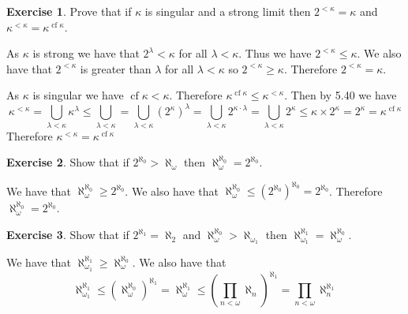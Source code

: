 \documentclass{article}
\theoremstyle{definition}
\newtheorem{exer}{Exercise}[section]
\DeclareMathOperator{\cf}{cf}
\newlength{\defparindent}
\newenvironment{answer}
    {\begin{mdframed}[backgroundcolor=gray!15, linewidth=0pt] \setlength{\parindent}{\defparindent}}
    {\end{mdframed}}
\begin{document}
\begin{exer}
    Prove that if $\kappa$ is singular and a strong limit then $2^{< \kappa} = \kappa$ and $\kappa^{< \kappa} = \kappa^{\cf \kappa}$.
    \begin{answer}
        As $\kappa$ is strong we have that $2^{\lambda} < \kappa$ for all $\lambda < \kappa$. Thus we have $2^{< \kappa} \le \kappa$. We also have that $2^{< \kappa}$ is greater than $\lambda$ for all $\lambda < \kappa$ so $2^{< \kappa} \ge \kappa$. Therefore $2^{< \kappa} = \kappa$.

        As $\kappa$ is singular we have $\cf \kappa < \kappa$. Therefore $\kappa^{\cf \kappa} \le \kappa^{< \kappa}$. Then by 5.40 we have 
        \[
            \kappa^{< \kappa} 
            =
            \bigcup_{\lambda < \kappa} \kappa^{\lambda} \le \bigcup_{\lambda < \kappa} 
            =
            \bigcup_{\lambda < \kappa}  (2^\kappa)^{\lambda} 
            =
            \bigcup_{\lambda < \kappa}  2^{\kappa \cdot \lambda} 
            =
            \bigcup_{\lambda < \kappa}  2^{\kappa} 
            \le
            \kappa \times 2^{\kappa}
            =
            2^{\kappa}
            = 
            \kappa^{\cf \kappa}
        \]
        Therefore $\kappa^{< \kappa} = \kappa^{\cf \kappa}$
    \end{answer}
\end{exer}

\begin{exer}
    Show that if $2^{\aleph_0} > \aleph_\omega$ then $\aleph_{\omega}^{\aleph_0} = 2^{\aleph_0}$.
    \begin{answer}
        We have that $\aleph_{\omega}^{\aleph_0} \ge 2^{\aleph_0}$. We also have that $\aleph_{\omega}^{\aleph_0} \le (2^{\aleph_0})^{\aleph_0} = 2^{\aleph_0}$. Therefore $\aleph_{\omega}^{\aleph_0} = 2^{\aleph_0}$.
    \end{answer}
\end{exer}

\begin{exer}
    Show that if $2^{\aleph_1} = \aleph_2$ and $\aleph_{\omega}^{\aleph_0} > \aleph_{\omega_1}$ then $\aleph_{\omega_1}^{\aleph_1} = \aleph_{\omega}^{\aleph_0}$.
    \begin{answer}
        We have that $\aleph_{\omega_1}^{\aleph_1} \ge \aleph_{\omega}^{\aleph_0}$. We also have that 
        \[
            \aleph_{\omega_1}^{\aleph_1} \le (\aleph_{\omega}^{\aleph_0})^{\aleph_1} = \aleph_{\omega}^{\aleph_1} \le (\prod_{n < \omega} \aleph_n)^{\aleph_1} = \prod_{n < \omega} \aleph_{n}^{\aleph_1}
        \]
    \end{answer}
\end{exer}
\end{document}
